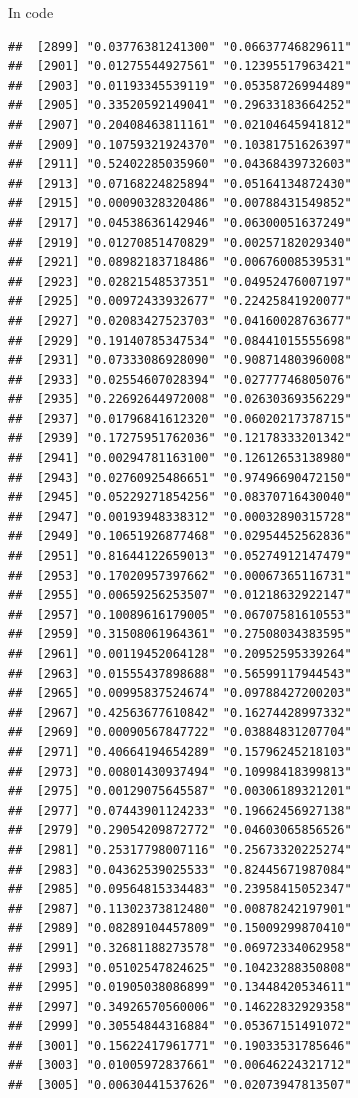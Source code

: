 \documentclass[ignorenonframetext,]{beamer}
\begin{document}
\begin{frame}[fragile]{In code}
\begin{verbatim}
##  [2899] "0.03776381241300" "0.06637746829611"
##  [2901] "0.01275544927561" "0.12395517963421"
##  [2903] "0.01193345539119" "0.05358726994489"
##  [2905] "0.33520592149041" "0.29633183664252"
##  [2907] "0.20408463811161" "0.02104645941812"
##  [2909] "0.10759321924370" "0.10381751626397"
##  [2911] "0.52402285035960" "0.04368439732603"
##  [2913] "0.07168224825894" "0.05164134872430"
##  [2915] "0.00090328320486" "0.00788431549852"
##  [2917] "0.04538636142946" "0.06300051637249"
##  [2919] "0.01270851470829" "0.00257182029340"
##  [2921] "0.08982183718486" "0.00676008539531"
##  [2923] "0.02821548537351" "0.04952476007197"
##  [2925] "0.00972433932677" "0.22425841920077"
##  [2927] "0.02083427523703" "0.04160028763677"
##  [2929] "0.19140785347534" "0.08441015555698"
##  [2931] "0.07333086928090" "0.90871480396008"
##  [2933] "0.02554607028394" "0.02777746805076"
##  [2935] "0.22692644972008" "0.02630369356229"
##  [2937] "0.01796841612320" "0.06020217378715"
##  [2939] "0.17275951762036" "0.12178333201342"
##  [2941] "0.00294781163100" "0.12612653138980"
##  [2943] "0.02760925486651" "0.97496690472150"
##  [2945] "0.05229271854256" "0.08370716430040"
##  [2947] "0.00193948338312" "0.00032890315728"
##  [2949] "0.10651926877468" "0.02954452562836"
##  [2951] "0.81644122659013" "0.05274912147479"
##  [2953] "0.17020957397662" "0.00067365116731"
##  [2955] "0.00659256253507" "0.01218632922147"
##  [2957] "0.10089616179005" "0.06707581610553"
##  [2959] "0.31508061964361" "0.27508034383595"
##  [2961] "0.00119452064128" "0.20952595339264"
##  [2963] "0.01555437898688" "0.56599117944543"
##  [2965] "0.00995837524674" "0.09788427200203"
##  [2967] "0.42563677610842" "0.16274428997332"
##  [2969] "0.00090567847722" "0.03884831207704"
##  [2971] "0.40664194654289" "0.15796245218103"
##  [2973] "0.00801430937494" "0.10998418399813"
##  [2975] "0.00129075645587" "0.00306189321201"
##  [2977] "0.07443901124233" "0.19662456927138"
##  [2979] "0.29054209872772" "0.04603065856526"
##  [2981] "0.25317798007116" "0.25673320225274"
##  [2983] "0.04362539025533" "0.82445671987084"
##  [2985] "0.09564815334483" "0.23958415052347"
##  [2987] "0.11302373812480" "0.00878242197901"
##  [2989] "0.08289104457809" "0.15009299870410"
##  [2991] "0.32681188273578" "0.06972334062958"
##  [2993] "0.05102547824625" "0.10423288350808"
##  [2995] "0.01905038086899" "0.13448420534611"
##  [2997] "0.34926570560006" "0.14622832929358"
##  [2999] "0.30554844316884" "0.05367151491072"
##  [3001] "0.15622417961771" "0.19033531785646"
##  [3003] "0.01005972837661" "0.00646224321712"
##  [3005] "0.00630441537626" "0.02073947813507"

\end{verbatim}
\end{frame}
\end{document}
